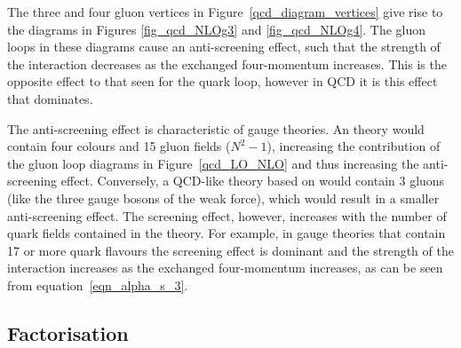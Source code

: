 The three and four gluon vertices in Figure~\ref{qcd_diagram_vertices} give rise to the diagrams in Figures \ref{fig_qcd_NLOg3} and \ref{fig_qcd_NLOg4}. The gluon loops in these diagrams cause an anti-screening effect, such that the strength of the interaction decreases as the exchanged four-momentum increases. This is the opposite effect to that seen for the quark loop, however in QCD it is this effect that dominates. 






The anti-screening effect is characteristic of  gauge theories. An  theory would contain four colours and 15 gluon fields ($N^2 -1$), increasing the contribution of the gluon loop diagrams in Figure~\ref{qcd_LO_NLO} and thus increasing the anti-screening effect. Conversely, a QCD-like theory based on  would contain 3 gluons (like the three gauge bosons of the weak force), which would result in a smaller anti-screening effect. The screening effect, however, increases with the number of quark fields contained in the theory. For example, in  gauge theories that contain 17 or more quark flavours the screening effect is dominant and the strength of the interaction increases as the exchanged four-momentum increases, as can be seen from equation~\ref{eqn_alpha_s_3}.



\subsection{Factorisation}
\label{sec_factorisation}

%

